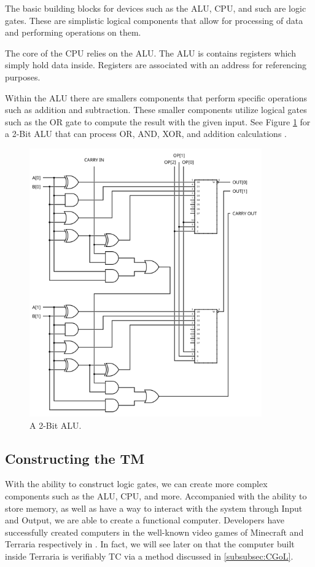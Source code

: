 The basic building blocks for devices such as the ALU, CPU, and such are logic gates.
These are simplistic logical components that allow for processing of data and performing operations on them.

The core of the CPU relies on the ALU.
The ALU is contains registers which simply hold data inside.
Registers are associated with an address for referencing purposes.

Within the ALU there are smallers components that perform specific operations such as addition and subtraction.
These smaller components utilize logical gates such as the OR gate to compute the result with the given input.
See Figure \ref{fig:2BitALU} for a 2-Bit ALU that can process OR, AND, XOR, and addition calculations \cite{ALUImg}.

\begin{figure}[htb]
    \centering
    \includegraphics[width=10cm]{Images/2-bit_ALU.svg.png}
       \caption{A 2-Bit ALU.}
           \label{fig:2BitALU}
\end{figure}

\subsection{Constructing the TM}\label{subsec:CreateTM}

With the ability to construct logic gates, we can create more complex components such as the ALU, CPU, and more.
Accompanied with the ability to store memory, as well as have a way to interact with the system through Input and Output, we are able to create a functional computer.
Developers have successfully created computers in the well-known video games of Minecraft and Terraria respectively in \cite{MCTM,TerrariaTM,TerrariaTMGH}.
In fact, we will see later on that the computer built inside Terraria is verifiably TC via a method discussed in \ref{subsubsec:CGoL}.

